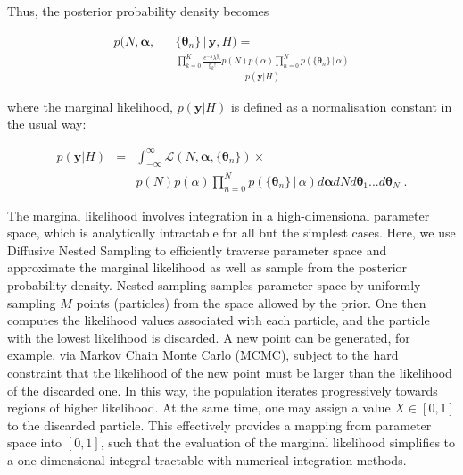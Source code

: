 \documentclass[12pt]{emulateapj}
\newcommand{\given}{\,|\,}
\newcommand{\counts}{y}
\newcommand{\likelihood}{{\mathcal L}}
\begin{document}
Thus, the posterior probability density becomes

\begin{eqnarray}
p(N, \bm{\alpha}, &&\{\bm{\theta}_n \}  \given \bm{\counts}, H) = \\ 
&& \frac{\prod\limits_{k=0}^{K}{ \frac{e^{-\lambda} \lambda^{y_k} }{y_k! }} p(N)p(\alpha) \prod\limits_{n=0}^{N}  p(\{\bm{\theta}_n\}\given \alpha)}{p(\bm{\counts} | H)}  \nonumber
\end{eqnarray}

where the marginal likelihood, $p(\bm{\counts} | H)$ is defined as a normalisation constant in the usual way: 

\begin{eqnarray}
p(\bm{\counts} | H) & = & \int_{-\infty}^{\infty}{\likelihood(N, \bm{\alpha}, \{\bm{\theta}_n \})} \times \\ \nonumber
&& p(N)p(\alpha) \prod\limits_{n=0}^{N}  p(\{\bm{\theta}_n\}\given \alpha) d\bm{\alpha} dN d\bm{\theta}_1 ... d\bm{\theta}_N \; .
\end{eqnarray}

The marginal likelihood involves integration in a high-dimensional parameter space, which is analytically intractable for all but the
simplest cases. Here, we use Diffusive Nested Sampling \citep{brewer2011} to efficiently traverse parameter space and approximate the marginal 
likelihood as well as sample from the posterior probability density. 
Nested sampling \citep{skilling2006} samples parameter space by uniformly sampling $M$ points (particles) from the space allowed by the prior. 
One then computes the likelihood values associated with each particle, and the particle with the lowest likelihood is discarded. A new point
can be generated, for example, via Markov Chain Monte Carlo (MCMC), subject to the hard constraint that the
likelihood of the new point must be larger than the likelihood of the discarded one. In this way, the population iterates progressively towards
regions of higher likelihood. At the same time, one may assign a value $X  \in [0, 1]$ to the discarded particle. This effectively provides a 
mapping from parameter space into $[0,1]$, such that the evaluation of the marginal likelihood simplifies to a one-dimensional 
integral tractable with numerical integration methods.
\end{document}
